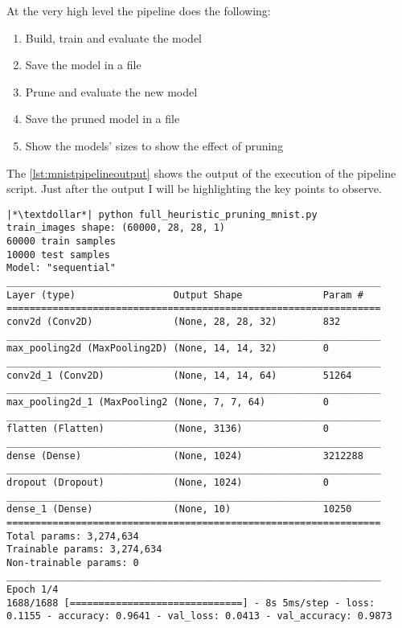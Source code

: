 At the very high level the pipeline does the following:
\begin{enumerate}
    \item Build, train and evaluate the model
    \item Save the model in a file
    \item Prune and evaluate the new model
    \item Save the pruned model in a file
    \item Show the models' sizes to show the effect of pruning
\end{enumerate}

The \autoref{lst:mnistpipelineoutput} shows the output of the execution of the
pipeline script. Just after the output I will be highlighting the key points to
observe.

\begin{lstlisting}[label={lst:mnistpipelineoutput},
    caption=MNIST pipeline output execution]
|*\textdollar*| python full_heuristic_pruning_mnist.py
train_images shape: (60000, 28, 28, 1)
60000 train samples
10000 test samples
Model: "sequential"
_________________________________________________________________
Layer (type)                 Output Shape              Param #
=================================================================
conv2d (Conv2D)              (None, 28, 28, 32)        832
_________________________________________________________________
max_pooling2d (MaxPooling2D) (None, 14, 14, 32)        0
_________________________________________________________________
conv2d_1 (Conv2D)            (None, 14, 14, 64)        51264
_________________________________________________________________
max_pooling2d_1 (MaxPooling2 (None, 7, 7, 64)          0
_________________________________________________________________
flatten (Flatten)            (None, 3136)              0
_________________________________________________________________
dense (Dense)                (None, 1024)              3212288
_________________________________________________________________
dropout (Dropout)            (None, 1024)              0
_________________________________________________________________
dense_1 (Dense)              (None, 10)                10250
=================================================================
Total params: 3,274,634
Trainable params: 3,274,634
Non-trainable params: 0
_________________________________________________________________
Epoch 1/4
1688/1688 [==============================] - 8s 5ms/step - loss: 0.1155 - accuracy: 0.9641 - val_loss: 0.0413 - val_accuracy: 0.9873

\end{lstlisting}
